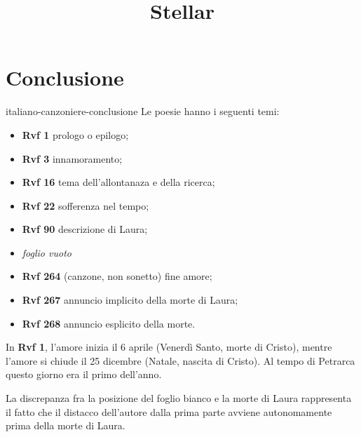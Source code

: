 \documentclass[preview]{standalone}
\begin{document}
\title{Stellar}
\genpage

\section{Conclusione}

\begin{snippet}{italiano-canzoniere-conclusione}
    Le poesie hanno i seguenti temi:
    \begin{itemize}
        \item \textbf{Rvf 1} prologo o epilogo;
        \item \textbf{Rvf 3} innamoramento;
        \item \textbf{Rvf 16} tema dell'allontanaza e della ricerca;
        \item \textbf{Rvf 22} sofferenza nel tempo;
        \item \textbf{Rvf 90} descrizione di Laura;
        \item \textit{foglio vuoto}
        \item \textbf{Rvf 264} (canzone, non sonetto) fine amore;
        \item \textbf{Rvf 267} annuncio implicito della morte di Laura;
        \item \textbf{Rvf 268} annuncio esplicito della morte.
    \end{itemize}
    
    In \textbf{Rvf 1}, l'amore inizia il 6 aprile (Venerdì Santo, morte di Cristo),
    mentre l'amore si chiude il 25 dicembre (Natale, nascita di Cristo).
    Al tempo di Petrarca questo giorno era il primo dell'anno. 
    
    La discrepanza fra la posizione del foglio bianco e la morte di Laura rappresenta il
    fatto che il distacco dell'autore dalla prima parte
    avviene autonomamente prima della morte di Laura.
\end{snippet}
\end{document}
